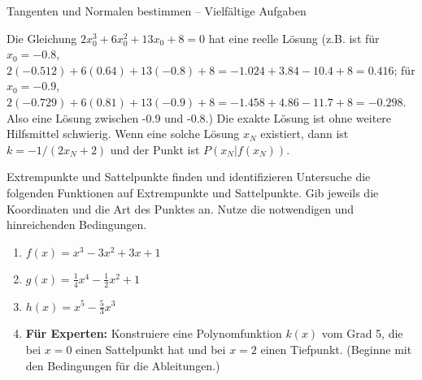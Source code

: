 \begin{loesungsumgebung}{Tangenten und Normalen bestimmen – Vielfältige Aufgaben}
\begin{enumerate}[label=(\alph*)]
\begin{itemize}
        Die Gleichung $2x_0^3 + 6x_0^2 + 13x_0 + 8 = 0$ hat eine reelle Lösung (z.B. ist für $x_0=-0.8$, $2(-0.512)+6(0.64)+13(-0.8)+8 = -1.024+3.84-10.4+8 = 0.416$; für $x_0=-0.9$, $2(-0.729)+6(0.81)+13(-0.9)+8 = -1.458+4.86-11.7+8 = -0.298$. Also eine Lösung zwischen -0.9 und -0.8.)
        Die exakte Lösung ist ohne weitere Hilfsmittel schwierig. Wenn eine solche Lösung $x_N$ existiert, dann ist $k = -1/(2x_N+2)$ und der Punkt ist $P(x_N|f(x_N))$.
    \end{itemize}
\end{enumerate}

\end{loesungsumgebung}

\begin{aufgabenumgebung}{Extrempunkte und Sattelpunkte finden und identifizieren}
Untersuche die folgenden Funktionen auf Extrempunkte und Sattelpunkte. Gib jeweils die Koordinaten und die Art des Punktes an. Nutze die notwendigen und hinreichenden Bedingungen.

\begin{enumerate}
    \item $f(x) = x^3 - 3x^2 + 3x + 1$


    \item $g(x) = \frac{1}{4}x^4 - \frac{1}{2}x^2 + 1$

    \item $h(x) = x^5 - \frac{5}{3}x^3$
    \item \textbf{Für Experten:} Konstruiere eine Polynomfunktion $k(x)$ vom Grad 5, die bei $x=0$ einen Sattelpunkt hat und bei $x=2$ einen Tiefpunkt. (Beginne mit den Bedingungen für die Ableitungen.)
\end{enumerate}
\end{aufgabenumgebung}



